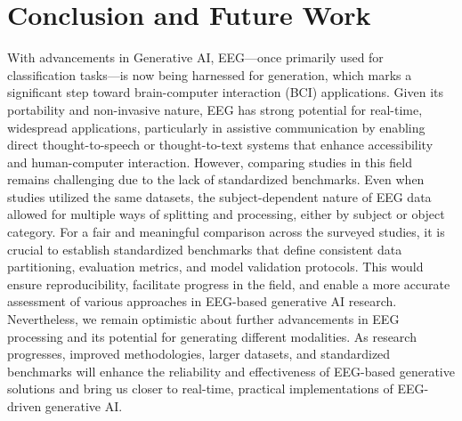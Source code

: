 \section{Conclusion and Future Work}
\label{sec:conclusion}
With advancements in Generative AI, EEG—once primarily used for classification tasks—is now being harnessed for generation, which marks a significant step toward brain-computer interaction (BCI) applications. Given its portability and non-invasive nature, EEG has strong potential for real-time, widespread applications, particularly in assistive communication by enabling direct thought-to-speech or thought-to-text systems that enhance accessibility and human-computer interaction. However, comparing studies in this field remains challenging due to the lack of standardized benchmarks. Even when studies utilized the same datasets, the subject-dependent nature of EEG data allowed for multiple ways of splitting and processing, either by subject or object category. For a fair and meaningful comparison across the surveyed studies, it is crucial to establish standardized benchmarks that define consistent data partitioning, evaluation metrics, and model validation protocols. This would ensure reproducibility, facilitate progress in the field, and enable a more accurate assessment of various approaches in EEG-based generative AI research. Nevertheless, we remain optimistic about further advancements in EEG processing and its potential for generating different modalities. As research progresses, improved methodologies, larger datasets, and standardized benchmarks will enhance the reliability and effectiveness of EEG-based generative solutions and bring us closer to real-time, practical implementations of EEG-driven generative AI.
